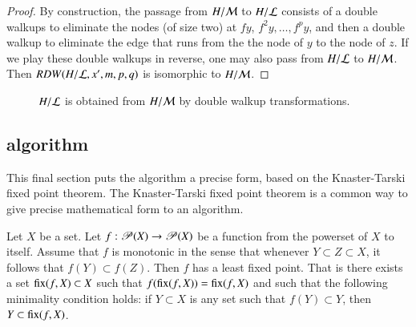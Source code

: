 \begin{proof}
%
  By construction, the passage from $H/{\cal M}$ to $H/{\cal L}$
  consists of a double walkups to eliminate the nodes (of size two) at
  $f y$, $f^2 y, \ldots, f^p y$, and then a double walkup to eliminate
  the edge that runs from the the node of $y$ to the node of
  $z$.  %
If we play these double walkups in reverse,
one may also pass from $H/{\cal L}$ to $H/{\cal M}$.  
Then $RDW(H/{\cal L},x',m,p,q)$ is isomorphic to
$H/{\cal M}$.  
\end{proof}


\begin{figure}[htb]
\centering
{}
\caption{$H/{\cal L}$ is obtained from $H/{\cal M}$ by double walkup
transformations.}
\label{fig:L1L2dart}
\end{figure}



\subsection{algorithm}

This final section puts the algorithm a precise form, based on
the Knaster-Tarski fixed point theorem.  The Knaster-Tarski fixed
point theorem is a common way to give precise mathematical form to
an algorithm.

\begin{lemma}   
Let $X$ be a set.  Let $f:{\mathscr P}(X)\to {\mathscr P}(X)$ be a
function from the powerset of $X$ to itself.  Assume that $f$ is
monotonic in the sense that whenever $Y\subset Z\subset X$, it
follows that $f(Y) \subset f(Z)$.  Then $f$ has a least fixed point.
That is there exists a set ${\operatorname{fix}}(f,X)\subset X$ such that
$f({\operatorname{fix}}(f,X)) = {\operatorname{fix}}(f,X)$ and such that the following
minimality condition holds: if $Y\subset X$ is any set such that
$f(Y) \subset Y$, then $Y\subset {\operatorname{fix}}(f,X)$.
\end{lemma}
%
%
%
%
%

